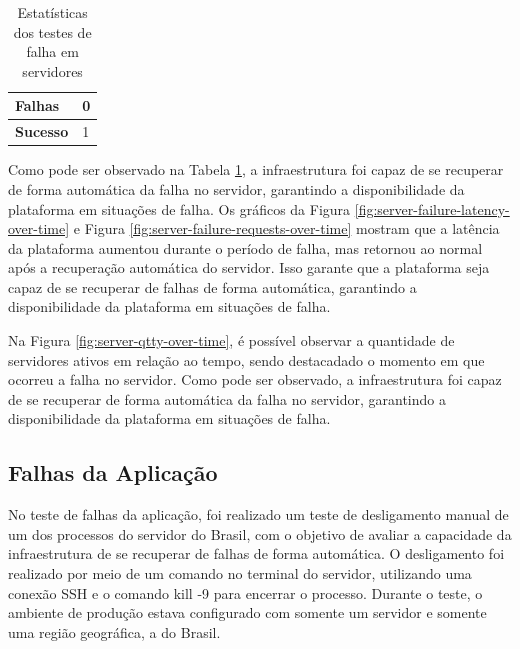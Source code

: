 
\begin{table}[H]
    \centering
    \caption{Estatísticas dos testes de falha em servidores}
    \label{tab:server-failure-stats}
    \begin{tabular}{|l|l|}
        \hline
        \textbf{Falhas}  & 0 \\ \hline
        \textbf{Sucesso} & 1 \\ \hline
    \end{tabular}
\end{table}

Como pode ser observado na Tabela \ref{tab:server-failure-stats}, a infraestrutura foi capaz de se recuperar de forma automática da falha no servidor, garantindo a disponibilidade da plataforma em situações de falha. Os gráficos da Figura \ref{fig:server-failure-latency-over-time} e Figura \ref{fig:server-failure-requests-over-time} mostram que a latência da plataforma aumentou durante o período de falha, mas retornou ao normal após a recuperação automática do servidor. Isso garante que a plataforma seja capaz de se recuperar de falhas de forma automática, garantindo a disponibilidade da plataforma em situações de falha.

Na Figura \ref{fig:server-qtty-over-time}, é possível observar a quantidade de servidores ativos em relação ao tempo, sendo destacadado o momento em que ocorreu a falha no servidor. Como pode ser observado, a infraestrutura foi capaz de se recuperar de forma automática da falha no servidor, garantindo a disponibilidade da plataforma em situações de falha.

\subsection{Falhas da Aplicação}

No teste de falhas da aplicação, foi realizado um teste de desligamento manual de um dos processos do servidor do Brasil, com o objetivo de avaliar a capacidade da infraestrutura de se recuperar de falhas de forma automática. O desligamento foi realizado por meio de um comando no terminal do servidor, utilizando uma conexão SSH e o comando kill -9 para encerrar o processo. Durante o teste, o ambiente de produção estava configurado com somente um servidor e somente uma região geográfica, a do Brasil. 


